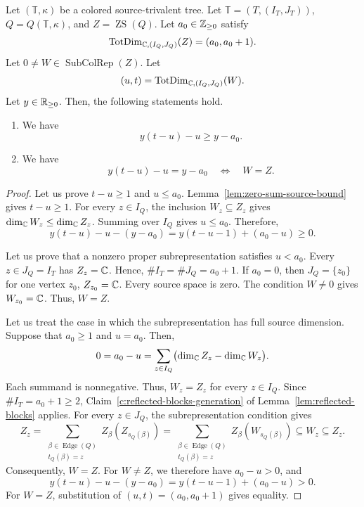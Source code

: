 \begin{lemma}\label{lem:zero-sum-weight}
Let $(\mathbb T,\kappa)$ be a colored source-trivalent tree.
Let $\mathbb T=(T,(I_T,J_T))$, $Q=Q(\mathbb T,\kappa)$, and $Z=\operatorname{ZS}(Q)$.
Let $a_0\in\mathbb Z_{\ge0}$ satisfy
\[
 \operatorname{TotDim}_{\mathbb C,(I_Q,J_Q)}(Z)=(a_0,a_0+1).
\]
Let $0\ne W\in\operatorname{SubColRep}(Z)$. Let
\[
 (u,t)=\operatorname{TotDim}_{\mathbb C,(I_Q,J_Q)}(W).
\]
Let $y\in\mathbb R_{\ge0}$.
Then, the following statements hold.
\begin{enumerate}
\item\label{c:zero-sum-weight-bound} We have
\[
 y(t-u)-u\ge y-a_0.
\]
\item\label{c:zero-sum-weight-equality} We have
\[
 y(t-u)-u=y-a_0\quad\Longleftrightarrow\quad W=Z.
\]
\end{enumerate}
\end{lemma}
\begin{proof}
 Let us prove $t-u\ge1$ and $u\le a_0$.
Lemma~\ref{lem:zero-sum-source-bound} gives $t-u\ge1$.
For every $z\in I_Q$, the inclusion $W_z\subseteq Z_z$ gives
$\dim_\mathbb C W_z\le\dim_\mathbb C Z_z$.
Summing over $I_Q$ gives $u\le a_0$.
Therefore,
\[
 y(t-u)-u-(y-a_0)=y(t-u-1)+(a_0-u)\ge0.
\]

 Let us prove that a nonzero proper subrepresentation satisfies $u<a_0$.
Every $z\in J_Q=I_T$ has $Z_z=\mathbb C$.
Hence, $\#I_T=\#J_Q=a_0+1$.
If $a_0=0$, then $J_Q=\{z_0\}$ for one vertex $z_0$,
$Z_{z_0}=\mathbb C$. Every source space is zero.
The condition $W\ne0$ gives $W_{z_0}=\mathbb C$. Thus, $W=Z$.

Let us treat the case in which the subrepresentation has full source dimension.
Suppose that $a_0\ge1$ and $u=a_0$.
Then,
\[
 0=a_0-u=\sum_{z\in I_Q}
       \bigl(\dim_\mathbb C Z_z-\dim_\mathbb C W_z\bigr).
\]
Each summand is nonnegative.
Thus, $W_z=Z_z$ for every $z\in I_Q$.
Since $\#I_T=a_0+1\ge2$, Claim~\ref{c:reflected-blocks-generation}
of Lemma~\ref{lem:reflected-blocks} applies.
For every $z\in J_Q$, the subrepresentation condition gives
\[
 Z_z
 =\sum_{\substack{\beta\in\operatorname{Edge}(Q)\\t_Q(\beta)=z}}
       Z_\beta(Z_{s_Q(\beta)})
 =\sum_{\substack{\beta\in\operatorname{Edge}(Q)\\t_Q(\beta)=z}}
       Z_\beta(W_{s_Q(\beta)})
 \subseteq W_z\subseteq Z_z.
\]
Consequently, $W=Z$.
For $W\ne Z$, we therefore have $a_0-u>0$, and
\[
 y(t-u)-u-(y-a_0)=y(t-u-1)+(a_0-u)>0.
\]
For $W=Z$, substitution of $(u,t)=(a_0,a_0+1)$ gives equality.
\end{proof}

